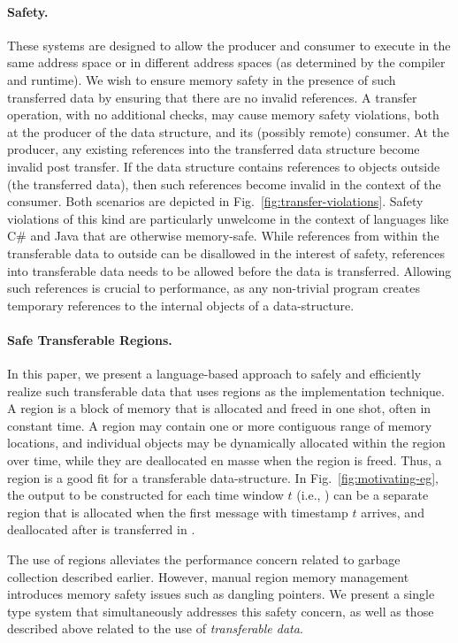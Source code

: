 \paragraph{Safety.}
These systems are designed to allow the producer and consumer to
execute in the same address space or in different address spaces
(as determined by the compiler and runtime).
We wish to ensure memory safety in the presence of such transferred data by ensuring
that there are no invalid references. A transfer operation, with no
additional checks, may cause memory safety violations, both at the
producer of the data structure, and its (possibly remote) consumer. At
the producer, any existing references into the transferred data structure become
invalid post transfer. If the data structure contains references to
objects outside (the transferred data), then such references become
invalid in the context of the consumer. Both scenarios are depicted in
Fig.~\ref{fig:transfer-violations}. Safety violations of this kind are
particularly unwelcome in the context of languages like C\# and Java
that are otherwise memory-safe. While references from within the
transferable data to outside can be disallowed in the interest of safety,
references into transferable data needs to be allowed before the data
is transferred. Allowing such references is crucial to performance,
as any non-trivial program creates temporary references to the internal
objects of a data-structure.

\paragraph{Safe Transferable Regions.}
In this paper, we present a language-based approach to safely and
efficiently realize such transferable data that uses regions as
the implementation technique.
%
A region is a block of memory that is allocated
and freed in one shot, often in constant time. A region may contain
one or more contiguous range of memory locations, and individual
objects may be dynamically allocated within the region over time,
while they are deallocated en masse when the region is freed.  Thus, a
region is a good fit for a transferable data-structure.  In
Fig.~\ref{fig:motivating-eg}, the output to be constructed for each
time window $t$ (i.e., ) can be a separate region that is
allocated when the first message with timestamp $t$ arrives, and
deallocated after  is transferred in .

The use of regions alleviates the performance concern related to
garbage collection described earlier.
However, manual region memory management introduces memory safety
issues such as dangling pointers.
We present a single type system that simultaneously addresses
this safety concern, as well as those described above related to
the use of \emph{transferable data}.

